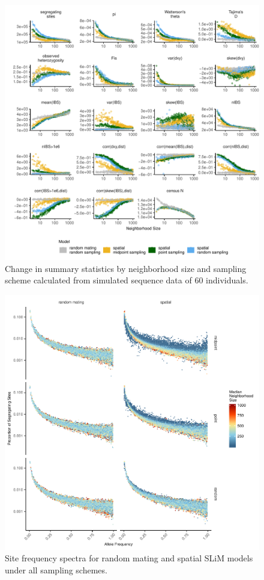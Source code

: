 \documentclass[10pt,twoside,lineno,hidelinks]{preprint}
\begin{document}
\afterpage{\clearpage}
\begin{figure}[p]
\centering
\includegraphics[width=\textwidth]{figures/sumstats_by_neighbors_allstats.pdf}
\caption{Change in summary statistics by neighborhood size and sampling scheme calculated from simulated sequence data of 60 individuals.}
\label{fig:allsumstats} 
\end{figure}


\afterpage{\clearpage}
\begin{figure}[p]
\centering
\includegraphics[width=\textwidth]{figures/fig_S1_sfs_grid_model_by_sampling.pdf}
\caption{Site frequency spectra for random mating and spatial SLiM models under all sampling schemes.}
\label{fig:allsfs}
\end{figure}
\end{document}
